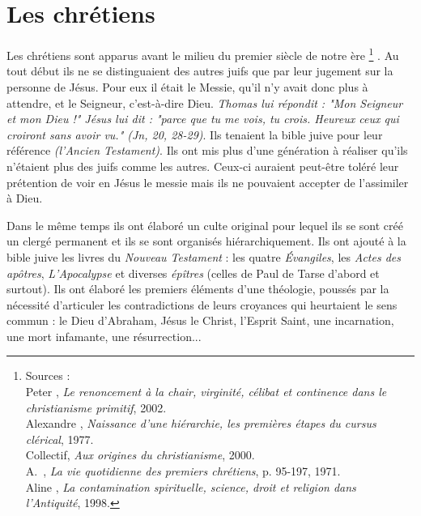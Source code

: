 


\chapter{Les chrétiens}


 Les chrétiens sont apparus avant le milieu du premier siècle de notre ère%
\footnote{Sources :\\
Peter , \emph{Le renoncement à la chair, virginité, célibat et continence dans le christianisme primitif}, 2002.\\
Alexandre , \emph{Naissance d'une hiérarchie, les premières étapes du cursus clérical}, 1977.\\
Collectif, \emph{Aux origines du christianisme}, 2000.\\
A.~, \emph{La vie quotidienne des premiers chrétiens}, p. 95-197, 1971.\\
Aline , \emph{La contamination spirituelle, science, droit et religion dans l'Antiquité}, 1998.}%
. Au tout début ils ne se distinguaient des autres juifs que par leur jugement sur la personne de Jésus. Pour eux il était le Messie, qu'il n'y avait donc plus à attendre, et le Seigneur, c'est-à-dire Dieu.  \emph{Thomas lui répondit : "Mon Seigneur et mon Dieu !" Jésus lui dit : "parce que tu me vois, tu crois. Heureux ceux qui croiront sans avoir vu." (Jn, 20, 28-29)}. Ils tenaient la bible juive pour leur référence \emph{(l'Ancien Testament)}. Ils ont mis plus d'une génération à réaliser qu'ils n'étaient plus des juifs comme les autres. Ceux-ci auraient peut-être toléré leur prétention de voir en Jésus le messie mais ils ne pouvaient accepter de l'assimiler à Dieu. 



Dans le même temps ils ont élaboré un culte original pour lequel ils se sont créé un clergé permanent et ils se sont organisés hiérarchiquement. Ils ont ajouté à la bible juive les livres du \emph{Nouveau Testament} : les quatre \emph{Évangiles}, les \emph{Actes des apôtres}, \emph{L'Apocalypse} et diverses \emph{épîtres} (celles de Paul de Tarse d'abord et surtout). Ils ont élaboré les premiers éléments d'une théologie, poussés par la nécessité d'articuler les contradictions de leurs croyances qui heurtaient le sens commun : le Dieu d'Abraham, Jésus le Christ, l'Esprit Saint, une incarnation, une mort infamante, une résurrection... 

